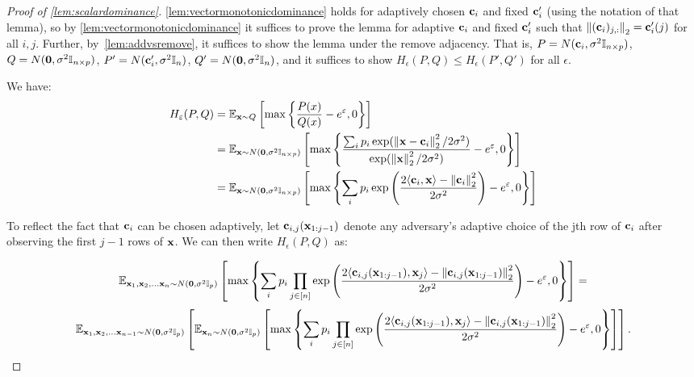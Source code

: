 \begin{proof}[Proof of \cref{lem:scalardominance}]
\cref{lem:vectormonotonicdominance} holds for adaptively chosen $\mathbf{c}_i$ and fixed $\mathbf{c}_i'$ (using the notation of that lemma), so by \cref{lem:vectormonotonicdominance} it suffices to prove the lemma for adaptive $\mathbf{c}_i$ and fixed $\mathbf{c}_i'$ such that $\left\|(\mathbf{c}_i)_{j,:}\right\|_2 = \mathbf{c}'_i(j)$ for all $i, j$. Further, by~\cref{lem:addvsremove}, it suffices to show the lemma under the remove adjacency. That is, $P = N(\mathbf{c}_i, \sigma^2 \mathbb{I}_{n \times p})$, $Q = N(\boldsymbol{0}, \sigma^2 \mathbb{I}_{n \times p})$, $P' = N(\mathbf{c}_i', \sigma^2 \mathbb{I}_{n})$, $Q' = N(\boldsymbol{0}, \sigma^2 \mathbb{I}_{n})$, and it suffices to show $H_\epsilon(P, Q) \leq H_\epsilon(P', Q')$ for all $\epsilon$.

We have:
\begin{align*}
H_\varepsilon(P, Q) &= \mathbb{E}_{\mathbf{x} \sim Q}\left[\max\left\{\frac{P(x)}{Q(x)} - e^\varepsilon, 0\right\}\right]\\
&= \mathbb{E}_{\mathbf{x} \sim N(\boldsymbol{0}, \sigma^2 \mathbb{I}_{n \times p})}\left[\max\left\{\frac{\sum_i p_i \exp(\left\|\mathbf{x} - \mathbf{c}_i\right\|_2^2 / 2\sigma^2)}{\exp(\left\|\mathbf{x}\right\|_2^2 / 2 \sigma^2)} - e^\varepsilon, 0\right\}\right]\\
&= \mathbb{E}_{\mathbf{x} \sim N(\boldsymbol{0}, \sigma^2 \mathbb{I}_{n \times p})}\left[\max\left\{\sum_i p_i \exp\left(\frac{2 \langle \mathbf{c}_i, \mathbf{x} \rangle - \left\|\mathbf{c}_i\right\|_2^2}{ 2\sigma^2}\right) - e^\varepsilon, 0\right\}\right]\\
\end{align*}

To reflect the fact that $\mathbf{c}_i$ can be chosen adaptively, let $\mathbf{c}_{i,j}(\mathbf{x}_{1:j-1})$ denote any adversary's adaptive choice of the jth row of $\mathbf{c}_i$ after observing the first $j-1$ rows of $\mathbf{x}$. We can then write $H_\epsilon(P, Q)$ as:

\[\mathbb{E}_{\mathbf{x}_1, \mathbf{x}_2, \ldots \mathbf{x}_n \sim N(\boldsymbol{0}, \sigma^2 \mathbb{I}_{p})}\left[\max\left\{\sum_i p_i \prod_{j \in [n]} \exp\left(\frac{2 \langle \mathbf{c}_{i,j}(\mathbf{x}_{1:j-1}), \mathbf{x}_j \rangle - \left\|\mathbf{c}_{i,j}(\mathbf{x}_{1:j-1})\right\|_2^2}{2\sigma^2}\right) - e^\varepsilon, 0\right\}\right] =\]
\begin{equation}\label{eq:nestedexp}
\mathbb{E}_{\mathbf{x}_1, \mathbf{x}_2, \ldots \mathbf{x}_{n-1} \sim N(\boldsymbol{0}, \sigma^2 \mathbb{I}_{p})}\left[\mathbb{E}_{\mathbf{x}_n \sim N(\boldsymbol{0}, \sigma^2 \mathbb{I}_{p})}\left[\max\left\{\sum_i p_i \prod_{j \in [n]} \exp\left(\frac{2 \langle \mathbf{c}_{i,j}(\mathbf{x}_{1:j-1}), \mathbf{x}_j \rangle - \left\|\mathbf{c}_{i,j}(\mathbf{x}_{1:j-1})\right\|_2^2}{ 2\sigma^2}\right) - e^\varepsilon, 0\right\}\right]\right].
\end{equation}


\end{proof}
